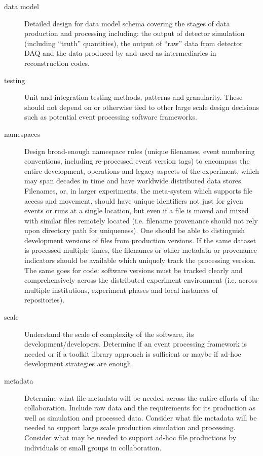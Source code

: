 \begin{description}
\item[data model] Detailed design for data model schema covering the
  stages of data production and processing including: the output of
  detector simulation (including ``truth'' quantities), the output of
  ``raw'' data from detector DAQ and the data produced by and used as
  intermediaries in reconstruction codes.

\item[testing] Unit and integration testing methods, patterns and
  granularity.  These should not depend on or otherwise tied to other
  large scale design decisions such as potential event processing
  software frameworks.  

\item[namespaces] Design broad-enough namespace rules (unique filenames, 
event numbering conventions, including re-processed event version tags) to 
encompass the entire development, operations and legacy aspects of the 
experiment, which may span decades in time and have worldwide distributed 
data stores.  Filenames, or, in larger experiments, the meta-system 
which supports file access and movement, should have unique identifiers 
not just for given events or runs at a single location, but even if 
a file is moved and mixed with similar files remotely located 
(i.e. filename provenance should not rely upon directory path for 
uniqueness).  One should be able to distinguish development versions 
of files from production versions.  
If the same dataset is processed multiple times, the filenames or 
other metadata or provenance indicators should be available which 
uniquely track the processing version.  The same goes for code:  
software versions must be tracked clearly and comprehensively across the 
distributed experiment environment (i.e. across multiple 
institutions, experiment phases and local instances of repositories).

\item[scale] Understand the scale of complexity of the software, its
  development/developers.  Determine if an event processing framework
  is needed or if a toolkit library approach is sufficient or maybe if
  ad-hoc development strategies are enough.

\item[metadata] Determine what file metadata will be needed across the
  entire efforts of the collaboration.  Include raw data and the
  requirements for its production as well as simulation and processed
  data.  Consider what file metadata will be needed to support large
  scale production simulation and processing.  Consider what may be
  needed to support ad-hoc file productions by individuals or small
  groups in collaboration.

\end{description}






